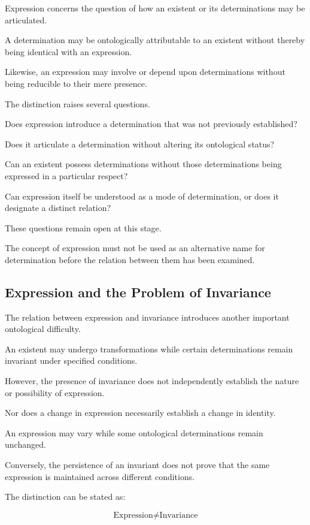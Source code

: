 Expression concerns the question of
how an existent or its determinations
may be articulated.

A determination may be ontologically
attributable to an existent without
thereby being identical with an expression.

Likewise, an expression may involve
or depend upon determinations without
being reducible to their mere presence.

The distinction raises several questions.

Does expression introduce a determination
that was not previously established?

Does it articulate a determination
without altering its ontological status?

Can an existent possess determinations
without those determinations being
expressed in a particular respect?

Can expression itself be understood
as a mode of determination, or does
it designate a distinct relation?

These questions remain open at this stage.

The concept of expression must not
be used as an alternative name for
determination before the relation
between them has been examined.

\subsection{Expression and the Problem of Invariance}

The relation between expression and
invariance introduces another important
ontological difficulty.

An existent may undergo transformations
while certain determinations remain
invariant under specified conditions.

However, the presence of invariance
does not independently establish
the nature or possibility of expression.

Nor does a change in expression necessarily
establish a change in identity.

An expression may vary while some
ontological determinations remain
unchanged.

Conversely, the persistence of an invariant
does not prove that the same expression
is maintained across different conditions.

The distinction can be stated as:

\[
\text{Expression}
\neq
\text{Invariance}
\]

